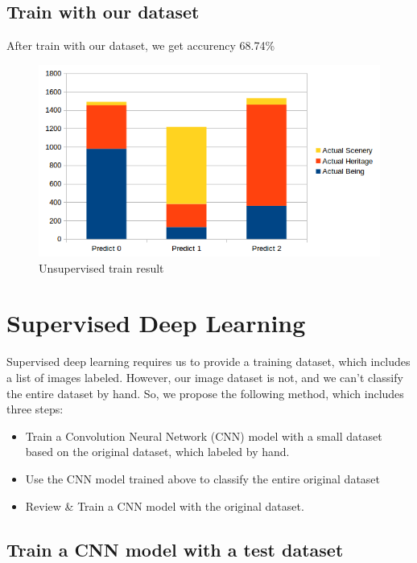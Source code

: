 \documentclass[11pt]{article}
\begin{document}
\subsection{Train with our dataset}

After train with our dataset, we get accurency 68.74\%

\begin{figure}[H]
\centering
\includegraphics[width=1\textwidth]{images/unsupervised_large_dataset_result}
\caption{Unsupervised train result}
\end{figure}








\section{Supervised Deep Learning}
Supervised deep learning requires us to provide a training dataset, which includes a list of images labeled. However, our image dataset is not, and we can't classify the entire dataset by hand. So, we propose the following method, which includes three steps:
\begin{itemize}
\item Train a Convolution Neural Network (CNN) model with a small dataset based on the original dataset, which labeled by hand.
\item Use the CNN model trained above to classify the entire original dataset
\item Review \& Train a CNN model with the original dataset.
\end{itemize}

\subsection{Train a CNN model with a test dataset}
\end{document}

